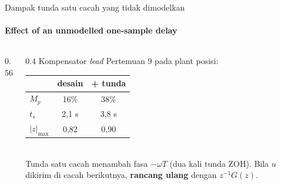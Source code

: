 \documentclass[aspectratio=169,10pt]{beamer}
\begin{document}
\begin{frame}{Dampak tunda satu cacah yang tidak dimodelkan}
	\framesubtitle{Effect of an unmodelled one-sample delay}
	\begin{columns}[c]
		\begin{column}{0.56\textwidth}
			\centering
		\end{column}
		\begin{column}{0.4\textwidth}
			\small
			Kompensator \textit{lead} Pertemuan 9 pada plant posisi:\\[3pt]
			\renewcommand{\arraystretch}{1.2}
			\begin{tabular}{@{}l c c@{}}
				\toprule
				 & desain & + tunda \\
				\midrule
				$M_p$ & 16\% & 38\% \\
				$t_s$ & 2,1 s & 3,8 s \\
				$|z|_{\max}$ & 0,82 & 0,90 \\
				\bottomrule
			\end{tabular}\\[4pt]
			Tunda satu cacah menambah fasa $-\omega T$ (dua kali tunda ZOH). Bila $u$ dikirim di cacah berikutnya, \textbf{rancang ulang} dengan $z^{-1}G(z)$.
		\end{column}
	\end{columns}
\end{frame}
\end{document}
